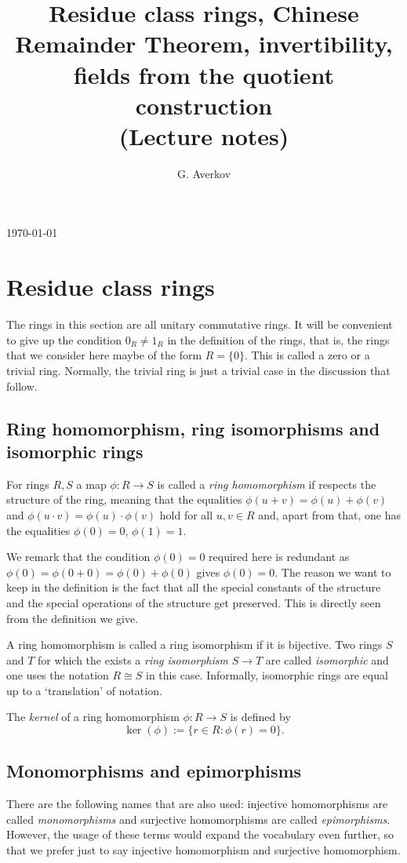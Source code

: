 \documentclass[11pt,a4paper]{amsart}
\title[Residue class rings and the CRT]{Residue class rings, Chinese Remainder Theorem, invertibility, fields from the quotient construction\\ (Lecture notes)}
\author{G. Averkov}
\begin{document}
 
	\maketitle
	\vspace{-2em}
	\begin{center} 
		\today 
	\end{center} 
	
\section{Residue class rings} 

The rings in this section are all unitary commutative rings. It will be convenient to give up the condition $0_R \ne 1_R$ in the definition of the rings, that is, the rings that we consider here maybe of the form $R = \{0\}$. This is called a zero or a trivial ring. Normally, the trivial ring is just a trivial case in the discussion that follow. 

\subsection{Ring homomorphism, ring isomorphisms and isomorphic rings} For rings $R,S$ a map $\phi : R \to S$ is called a \emph{ring homomorphism} if respects the structure of the ring, meaning that the equalities $\phi(u+v) = \phi(u)+\phi(v)$ and $\phi(u \cdot v) = \phi(u) \cdot \phi(v)$ hold for all $u,v \in R$ and, apart from that, one has the equalities $\phi(0) = 0$, $\phi(1) = 1$. 

We remark that the condition $\phi(0)=0$ required here is redundant as $\phi(0) = \phi(0+0)=\phi(0) + \phi(0)$ gives $\phi(0) = 0$. The reason we want to keep in the definition is the fact that all the special constants of the structure and the special operations of the structure get preserved. This is directly seen from the definition we give.

A ring homomorphism is called a ring isomorphism if it is bijective. Two rings $S$ and $T$ for which the exists a \emph{ring isomorphism} $S \to T$ are called \emph{isomorphic} and one uses the notation $R \cong S$ in this case. Informally, isomorphic rings are equal up to a `translation' of notation. 

The \emph{kernel} of  a ring homomorphism $\phi : R \to S$ is defined by 
\[
	\ker(\phi) := \{ r \in R \colon \phi(r) = 0 \}. 
\]

\subsection{Monomorphisms and epimorphisms} There are the following names that are also used: injective homomorphisms are called \emph{monomorphisms} and surjective homomorphisms are called \emph{epimorphisms}. However, the usage of these terms would expand the vocabulary even further, so that we prefer just to say injective  homomorphism and surjective homomorphism. 
\end{document}
